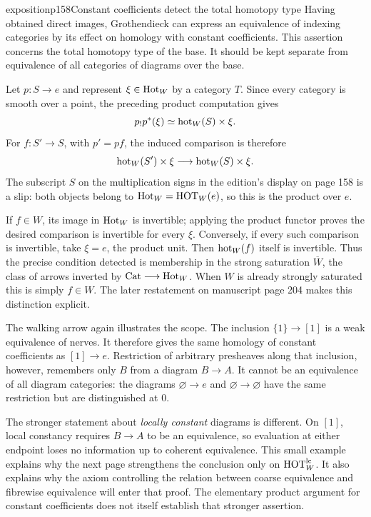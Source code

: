\begin{dcomment}{exposition}{p158}{Constant coefficients detect the total homotopy type}
Having obtained direct images, Grothendieck can express an equivalence of indexing categories by its effect on homology with constant coefficients. This assertion concerns the total homotopy type of the base. It should be kept separate from equivalence of all categories of diagrams over the base.

Let $p:S\longrightarrow e$ and represent $\xi\in\mathrm{Hot}_W$ by a category $T$. Since every category is smooth over a point, the preceding product computation gives
\[
 p_!p^*(\xi)\simeq\mathrm{hot}_W(S)\times\xi.
\]
For $f:S'\longrightarrow S$, with $p'=pf$, the induced comparison is therefore
\[
 \mathrm{hot}_W(S')\times\xi\longrightarrow\mathrm{hot}_W(S)\times\xi.
\]
The subscript $S$ on the multiplication signs in the edition's display on page 158 is a slip: both objects belong to $\mathrm{Hot}_W=\mathrm{HOT}_W(e)$, so this is the product over $e$.

If $f\in W$, its image in $\mathrm{Hot}_W$ is invertible; applying the product functor proves the desired comparison is invertible for every $\xi$. Conversely, if every such comparison is invertible, take $\xi=e$, the product unit. Then $\mathrm{hot}_W(f)$ itself is invertible. Thus the precise condition detected is membership in the strong saturation $\overline W$, the class of arrows inverted by $\mathrm{Cat}\longrightarrow\mathrm{Hot}_W$. When $W$ is already strongly saturated this is simply $f\in W$. The later restatement on manuscript page 204 makes this distinction explicit.

The walking arrow again illustrates the scope. The inclusion $\{1\}\longrightarrow[1]$ is a weak equivalence of nerves. It therefore gives the same homology of constant coefficients as $[1]\longrightarrow e$. Restriction of arbitrary presheaves along that inclusion, however, remembers only $B$ from a diagram $B\longrightarrow A$. It cannot be an equivalence of all diagram categories: the diagrams $\varnothing\longrightarrow e$ and $\varnothing\longrightarrow\varnothing$ have the same restriction but are distinguished at $0$.

The stronger statement about \emph{locally constant} diagrams is different. On $[1]$, local constancy requires $B\longrightarrow A$ to be an equivalence, so evaluation at either endpoint loses no information up to coherent equivalence. This small example explains why the next page strengthens the conclusion only on $\mathrm{HOT}_W^{\mathrm{lc}}$. It also explains why the axiom controlling the relation between coarse equivalence and fibrewise equivalence will enter that proof. The elementary product argument for constant coefficients does not itself establish that stronger assertion.
\end{dcomment}


